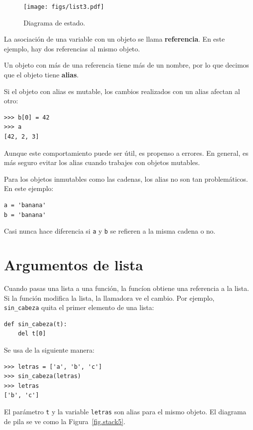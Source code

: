 \documentclass[10pt]{book}
\begin{document}
\begin{figure}
\centerline
{\texttt{[image: figs/list3.pdf]}}
\caption{Diagrama de estado.}
\label{fig.list3}
\end{figure}

La asociación de una variable con un objeto se llama {\bf
referencia}.  En este ejemplo, hay dos referencias al mismo
objeto.

Un objeto con más de una referencia tiene más
de un nombre, por lo que decimos que el objeto tiene {\bf alias}.

Si el objeto con alias es mutable, los cambios realizados con un alias afectan
al otro:

\begin{verbatim}
>>> b[0] = 42
>>> a
[42, 2, 3]
\end{verbatim}
%
Aunque este comportamiento puede ser útil, es propenso a errores.  En general,
es más seguro evitar los alias cuando trabajes con objetos
mutables.

Para los objetos inmutables como las cadenas, los alias no son tan
problemáticos.  En este ejemplo:

\begin{verbatim}
a = 'banana'
b = 'banana'
\end{verbatim}
%
Casi nunca hace diferencia si {\tt a} y {\tt b} se refieren
a la misma cadena o no.


\section{Argumentos de lista}
\label{list.arguments}

Cuando pasas una lista a una función, la funcíon obtiene una referencia a
la lista.  Si la función modifica la lista, la llamadora ve
el cambio.  Por ejemplo, \verb"sin_cabeza" quita el primer elemento
de una lista:

\begin{verbatim}
def sin_cabeza(t):
    del t[0]
\end{verbatim}
%
Se usa de la siguiente manera:

\begin{verbatim}
>>> letras = ['a', 'b', 'c']
>>> sin_cabeza(letras)
>>> letras
['b', 'c']
\end{verbatim}
%
El parámetro {\tt t} y la variable {\tt letras} son
alias para el mismo objeto.  El diagrama de pila se ve como la
Figura~\ref{fig.stack5}.
\end{document}
